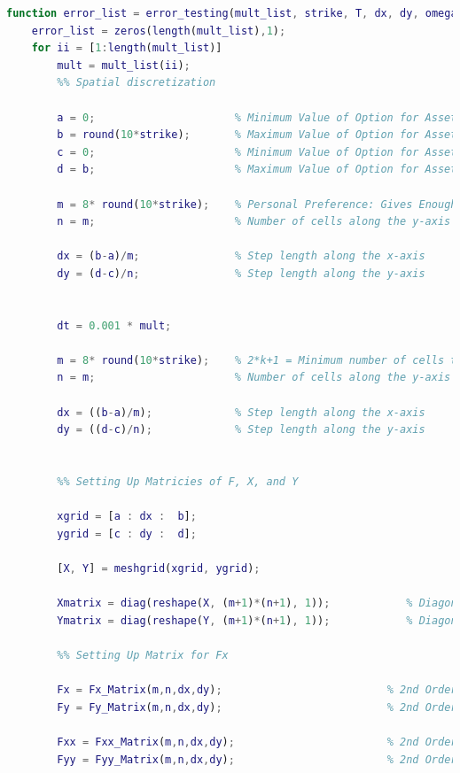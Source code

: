 \documentclass[12pt,letterpaper]{article}
\begin{document}
\begin{lstlisting}[language = Matlab]
function error_list = error_testing(mult_list, strike, T, dx, dy, omega11, omega12, r)
    error_list = zeros(length(mult_list),1);
    for ii = [1:length(mult_list)]
        mult = mult_list(ii);
        %% Spatial discretization

        a = 0;                      % Minimum Value of Option for Asset X (must be zero)
        b = round(10*strike);       % Maximum Value of Option for Asset X
        c = 0;                      % Minimum Value of Option for Asset Y (must be zero)
        d = b;                      % Maximum Value of Option for Asset X
        
        m = 8* round(10*strike);    % Personal Preference: Gives Enough Divisions for a More Accurate Result
        n = m;                      % Number of cells along the y-axis
        
        dx = (b-a)/m;               % Step length along the x-axis
        dy = (d-c)/n;               % Step length along the y-axis


        dt = 0.001 * mult;  
        
        m = 8* round(10*strike);    % 2*k+1 = Minimum number of cells to attain the desired accuracy
        n = m;                      % Number of cells along the y-axis
        
        dx = ((b-a)/m);             % Step length along the x-axis
        dy = ((d-c)/n);             % Step length along the y-axis
       
        
        %% Setting Up Matricies of F, X, and Y
        
        xgrid = [a : dx :  b];
        ygrid = [c : dy :  d];
        
        [X, Y] = meshgrid(xgrid, ygrid);
        
        Xmatrix = diag(reshape(X, (m+1)*(n+1), 1));            % Diagonal Matrix of X Mesh for Calculating A
        Ymatrix = diag(reshape(Y, (m+1)*(n+1), 1));            % Diagonal Matrix of Y Mesh for Calculating A
        
        %% Setting Up Matrix for Fx
        
        Fx = Fx_Matrix(m,n,dx,dy);                          % 2nd Order 2D Scheme for First Derivative with Respect to X
        Fy = Fy_Matrix(m,n,dx,dy);                          % 2nd Order 2D Scheme for First Derivative with Respect to Y
        
        Fxx = Fxx_Matrix(m,n,dx,dy);                        % 2nd Order 2D Scheme for Second Derivative with Respect to X
        Fyy = Fyy_Matrix(m,n,dx,dy);                        % 2nd Order 2D Scheme for Second Derivative with Respect to Y
        

\end{lstlisting}
\end{document}
